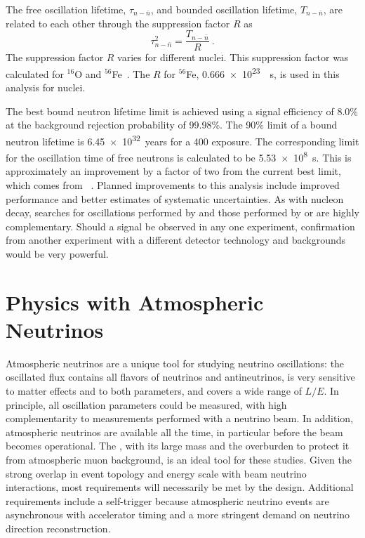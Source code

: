 The free \nnbar oscillation lifetime, $\tau_{n-\bar{n}}$, and bounded \nnbar oscillation lifetime, $T_{n-\bar{n}}$, are related to each other through the suppression factor $R$ as
%
\begin{equation}
    \tau^{2}_{n-\bar{n}} = \frac{T_{n-\bar{n}}}{R} ~.
    \label{eq:tau}
\end{equation}
The suppression factor $R$ varies for different nuclei. This suppression factor was calculated for $^{16}$O and $^{56}$Fe~\cite{Friedman:2008es}. The $R$ for $^{56}$Fe, \SI{0.666e23}{\per\s}, is used in this analysis for  nuclei.

The best bound neutron lifetime limit is achieved using a signal efficiency of \num{8.0}\% at the background rejection probability of \num{99.98}\%. The \num{90}\%  limit of a bound neutron lifetime is \SI{6.45e32}{years} for a \SI{400}{\ktyr} exposure. The corresponding limit for the oscillation time of free neutrons is calculated to be \SI{5.53e8}{\s}. This is approximately an improvement by a factor of two from the current best limit, which comes from \superk~\cite{Abe:2011ky}.  Planned improvements to this analysis include improved  performance and better estimates of systematic uncertainties.  As with nucleon decay, searches for \nnbar oscillations performed by  and those performed by \superk or \hyperk are highly complementary.  Should a signal be observed in any one experiment, confirmation from another experiment with a different detector technology and backgrounds would be very powerful. 

\section{Physics with Atmospheric Neutrinos}
\label{sec:nonaccel-atm}

Atmospheric neutrinos are a unique tool for studying neutrino oscillations: the oscillated flux contains all flavors of neutrinos and antineutrinos, is very sensitive to matter effects and to both \dm{} parameters, and covers a wide range of $L/E$. In principle, all oscillation parameters could be measured, with high
complementarity to measurements performed with a neutrino beam. In addition, atmospheric neutrinos are available all the time, in particular before the beam becomes operational. The  , with its large mass and the overburden to protect it from atmospheric muon background, is an ideal tool for these studies.  Given the strong overlap in event topology and energy scale with beam neutrino interactions, most requirements will necessarily be met by the  design. Additional requirements include a self-trigger because atmospheric neutrino events are asynchronous with accelerator timing and a more stringent demand on neutrino direction reconstruction.

